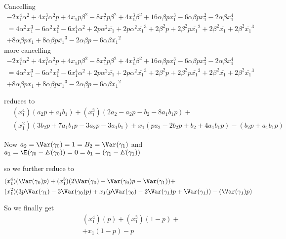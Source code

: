 Cancelling
\begin{align*}
	  - 2 x_1^4 \alpha^2 + 4 x_1^3 \alpha^2 p + 4x_1 p \beta^2 - 8 x_1^2 p \beta^2 + 4 x_1^3 \beta^2 + 16 \alpha \beta p x_1^3 - 6 \alpha \beta p x_1^2 - 2 \alpha \beta x_1^4 \\
	  = 4 \alpha^2 x_1^3 - 6 \alpha^2 x_1^2 - 6 x_1^4 \alpha^2 + 2p \alpha^2 \bar{x_1} + 2p \alpha^2 \bar{x_1}^3
	  + 2 \beta^2 p + 2 \beta^2 p \bar{x_1}^2 + 2 \beta^2 \bar{x_1} + 2 \beta^2 \bar{x_1}^3 \\
	  + 8 \alpha \beta p \bar{x_1} + 8 \alpha \beta p \bar{x_1}^3 - 2 \alpha \beta p - 6 \alpha \beta \bar{x_1}^2 
\end{align*} 
more cancelling
\begin{align*}
	  - 2 x_1^4 \alpha^2 + 4 x_1^3 \alpha^2 p + 4x_1 p \beta^2 - 8 x_1^2 p \beta^2 + 4 x_1^3 \beta^2 + 16 \alpha \beta p x_1^3 - 6 \alpha \beta p x_1^2 - 2 \alpha \beta x_1^4 \\
	  = 4 \alpha^2 x_1^3 - 6 \alpha^2 x_1^2 - 6 x_1^4 \alpha^2 + 2p \alpha^2 \bar{x_1} + 2p \alpha^2 \bar{x_1}^3
	  + 2 \beta^2 p + 2 \beta^2 p \bar{x_1}^2 + 2 \beta^2 \bar{x_1} + 2 \beta^2 \bar{x_1}^3 \\
	  + 8 \alpha \beta p \bar{x_1} + 8 \alpha \beta p \bar{x_1}^3 - 2 \alpha \beta p - 6 \alpha \beta \bar{x_1}^2 
\end{align*} 

reduces to
\begin{align*}
	&(x_1^4)(a_2p + a_1b_1) + (x_1^3)(2a_2 - a_2p - b_2 - 8a_1b_1p ) + \\
    &(x_1^2)(3b_2p + 7a_1b_1p - 3a_2p - 3a_1b_1) + x_1(pa_2 - 2b_2p + b_2 + 4a_1b_1p) - (b_2p+ a_1b_1p)
\end{align*} 


Now $a_2 = \Var(\gamma_0) = 1 = B_2 = \Var(\gamma_1)$ and $a_1 = \E(\gamma_0 - E(\gamma_0)) = 0 = b_1 =(\gamma_1 - E(\gamma_1)) $

so we further reduce to
 \begin{align*}
	&(x_1^4)(\Var(\gamma_0)p) + (x_1^3)(2 \Var(\gamma_0) - \Var(\gamma_0) p - \Var(\gamma_1)) + \\
    &(x_1^2)(3p \Var(\gamma_1)  - 3 \Var(\gamma_0)p) + x_1(p \Var(\gamma_0) - 2 \Var(\gamma_1)p + \Var(\gamma_1)) - (\Var(\gamma_1) p)
\end{align*} 

So we finally get
\begin{align*}
	&(x_1^4)(p) + (x_1^3)(1 - p) + \\
    & + x_1(1 - p) - p
\end{align*} 

